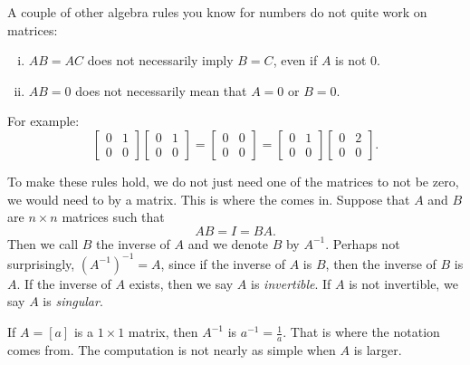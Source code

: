 A couple of other algebra rules you know for numbers do not quite
work on matrices:
\begin{enumerate}[(i)]
\item $AB = AC$ does not necessarily imply $B=C$, even if $A$ is not 0.
\item $AB = 0$ does not necessarily mean that $A=0$ or $B=0$.
\end{enumerate}
For example:
\begin{equation*}
\begin{bmatrix} 0 & 1 \\ 0 & 0 \end{bmatrix}
\begin{bmatrix} 0 & 1 \\ 0 & 0 \end{bmatrix}
=
\begin{bmatrix} 0 & 0 \\ 0 & 0 \end{bmatrix}
=
\begin{bmatrix} 0 & 1 \\ 0 & 0 \end{bmatrix}
\begin{bmatrix} 0 & 2 \\ 0 & 0 \end{bmatrix} .
\end{equation*}

To make these rules hold, we do not just need one of the matrices to not be zero,
we would need to  by
a matrix.  This is where the \emph{} comes in.
Suppose that $A$ and $B$ are $n \times n$ matrices such that
\begin{equation*}
AB = I = BA .
\end{equation*}
Then we call $B$ the inverse of $A$ and we denote $B$ by $A^{-1}$.
Perhaps not surprisingly, ${(A^{-1})}^{-1} = A$, since if the inverse of $A$ 
is $B$, then the inverse of $B$ is $A$.
If the inverse of $A$ exists, then we say $A$ is
\emph{invertible}.
If $A$ is not invertible, we say $A$ is
\emph{singular}.

If $A = [a]$ is a $1 \times 1$ matrix, then $A^{-1}$ is $a^{-1} =
\frac{1}{a}$.  That is where the notation comes from.  The computation is not nearly as simple when $A$ is
larger.


